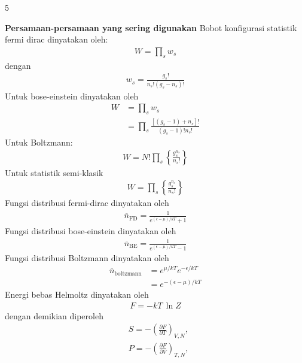 \documentclass[a4paper  , 6 pt]{article}
\begin{document}
\begin{tiny}
\begin{multicols} {5}

\setlength \belowdisplayskip{0 pt} 
\setlength \abovedisplayskip{0 pt}
\textbf{Persamaan-persamaan yang sering digunakan } \newline Bobot konfigurasi statistik fermi dirac dinyatakan oleh:
\begin{align}
W = \prod_s w_s 
\end{align}
dengan 
\begin{align}
w_s = \frac{g_s !}{n_s ! (g_s - n_s) !} 
\end{align}
Untuk bose-einstein dinyatakan oleh
\begin{align}
W& = \prod_s w_s \nonumber \\
& = \prod_s \frac{[(g_s - 1) + n_s] !}{(g_s - 1)! n_s ! }
\end{align} 
Untuk Boltzmann:
\begin{align}
W = N! \prod_s \left \lbrace \frac{g_s^{n_s}}{n_s !}\right \rbrace 
\end{align}
Untuk statistik semi-klasik 
\begin{align}
W =  \prod_s \left \lbrace \frac{g_s^{n_s}}{n_s !}\right \rbrace 
\end{align}
Fungsi distribusi fermi-dirac dinyatakan oleh
\begin{align}
\overline{n}_\mathrm{FD} =  \frac{1}{e^{(\epsilon - \mu )/kT} +1} 
\end{align}
Fungsi distribusi bose-einstein dinyatakan oleh 
\begin{align}
\overline{n}_\mathrm{BE} =  \frac{1}{e^{(\epsilon - \mu )/kT} - 1} 
\end{align}
Fungsi distribusi Boltzmann dinyatakan oleh
\begin{align}
\overline{n}_\mathrm{boltzmann} &= e^{\mu/ kT} e^{- \epsilon / kT} \nonumber \\
& = e^{- (\epsilon - \mu )/ kT} 
\end{align}           
Energi bebas Helmoltz dinyatakan oleh
\begin{align}
F = - kT \, \ln Z 
\end{align}
dengan demikian diperoleh
\begin{align}
& S = -\left(\frac{\partial F}{\partial T}\right)_{V,N}, \\
& P  = - \left(\frac{\partial F}{\partial V}\right)_{T,N}, \\

\end{align}
\end{multicols}
\end{tiny}
\end{document}
